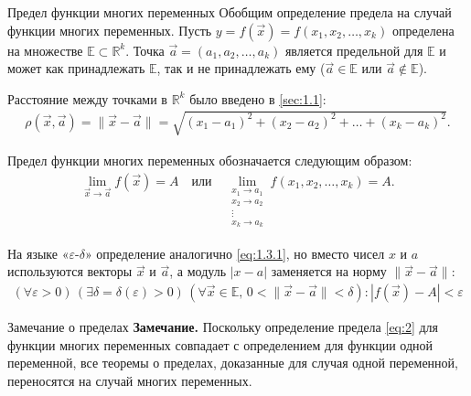 \begin{tbox}{Предел функции многих переменных}
	Обобщим определение предела на случай функции многих переменных. Пусть \( y = f(\vec{x}) = f(x_1, x_2, \dots, x_k) \) определена на множестве \( \mathbb{E} \subset \mathbb{R}^k \). Точка \( \vec{a} = (a_1, a_2, \dots, a_k) \) является предельной для \( \mathbb{E} \) и может как принадлежать \( \mathbb{E} \), так и не принадлежать ему (\( \vec{a} \in \mathbb{E} \) или \( \vec{a} \notin \mathbb{E} \)).

	Расстояние между точками в \( \mathbb{R}^k \) было введено в \cref{sec:1.1}:
	\begin{align}
		\rho(\vec{x}, \vec{a}) = \|\vec{x} - \vec{a}\| =
		\sqrt{(x_1 - a_1)^2 + (x_2 - a_2)^2 + \dots + (x_k - a_k)^2}.
	\end{align}

	Предел функции многих переменных обозначается следующим образом:
	\begin{align}
		\lim_{\vec{x} \to \vec{a}} f(\vec{x}) = A \quad \text{или} \quad
		\lim_{\substack{x_1 \to a_1 \\ x_2 \to a_2 \\ \vdots \\ x_k \to a_k}}
		f(x_1, x_2, \dots, x_k) = A.
	\end{align}

	На языке «\(\varepsilon\)-\(\delta\)» определение аналогично \cref{eq:1.3.1}, но вместо чисел \( x \) и \( a \) используются векторы \( \vec{x} \) и \( \vec{a} \), а модуль \( |x - a| \) заменяется на норму \( \|\vec{x} - \vec{a}\| \):
	\begin{align}
		(\forall \varepsilon > 0) \, (\exists \delta = \delta(\varepsilon) > 0) \,
		(\forall \vec{x} \in \mathbb{E}, \, 0 < \|\vec{x} - \vec{a}\| < \delta) :
		|f(\vec{x}) - A| < \varepsilon
		\label{eq:2}
	\end{align}
\end{tbox}

\begin{tbox*}{Замечание о пределах}
	\textbf{Замечание.} Поскольку определение предела \eqref{eq:2} для функции многих переменных совпадает с определением для функции одной переменной, все теоремы о пределах, доказанные для случая одной переменной, переносятся на случай многих переменных.
\end{tbox*}

